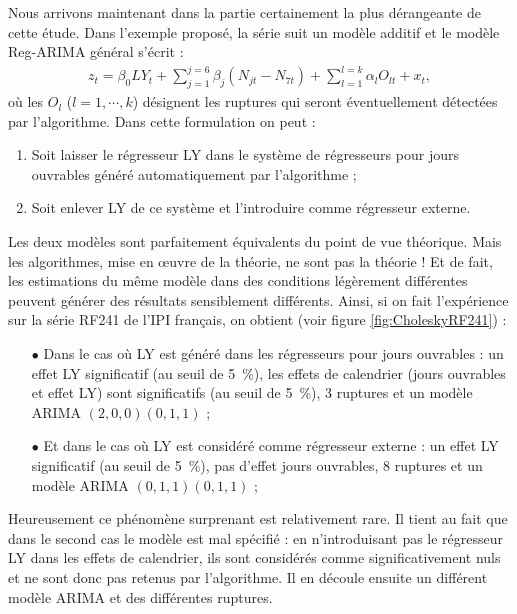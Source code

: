 \documentclass[12pt, a4paper, french]{article}
\begin{document}
Nous arrivons maintenant dans la partie certainement la plus dérangeante de cette étude. Dans l'exemple proposé, la série suit un modèle additif et le modèle Reg-ARIMA général s'écrit :
\begin{eqnarray}
	\label{eq:eq4}
z_t=\beta_0 LY_t + \sum_{j=1}^{j=6} \beta_j \left(N_{jt} - N_{7t}\right) + \sum_{l=1}^{l=k} \alpha_l O_{lt} + x_t,
\end{eqnarray}
où les $O_l$ ($l=1, \cdots, k$) désignent les ruptures qui seront éventuellement détectées par l'algorithme. Dans cette formulation on peut :
\begin{enumerate}
	\item Soit laisser le régresseur LY dans le système de régresseurs pour jours ouvrables généré automatiquement par l'algorithme ;
	\item Soit enlever LY de ce système et l'introduire comme régresseur externe.
\end{enumerate}
Les deux modèles sont parfaitement équivalents du point de vue théorique. Mais les algorithmes, mise en œuvre de la théorie, ne sont pas la théorie ! Et de fait, les estimations du même modèle dans des conditions légèrement différentes peuvent générer des résultats sensiblement différents. Ainsi, si on fait l'expérience sur la série RF241 de l'IPI français, on obtient (voir figure \ref{fig:CholeskyRF241}) :
\begin{itemize}
	\item[$\bullet$] Dans le cas où LY est généré dans les régresseurs pour jours ouvrables : un effet LY significatif (au seuil de 5~\%), les effets de calendrier (jours ouvrables et effet LY) sont significatifs (au seuil de 5~\%), 3 ruptures et un modèle ARIMA $(2,0,0)(0,1,1)$ ;
	\item[$\bullet$] Et dans le cas où LY est considéré comme régresseur externe : un effet LY significatif (au seuil de 5~\%), pas d'effet jours ouvrables, 8 ruptures et un modèle ARIMA $(0,1,1)(0,1,1)$ ;
\end{itemize}

Heureusement ce phénomène surprenant est relativement rare. Il tient au fait que dans le second cas le modèle est mal spécifié : en n'introduisant pas le régresseur LY dans les effets de calendrier, ils sont considérés comme significativement nuls et ne sont donc pas retenus par l'algorithme. Il en découle ensuite un différent modèle ARIMA et des différentes ruptures.
\end{document}

